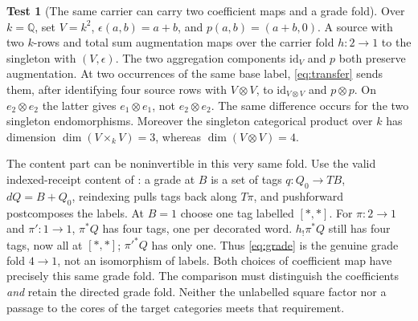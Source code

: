 \documentclass[11pt]{article}
\theoremstyle{definition}
\newtheorem{example}[theorem]{Test}
\newcommand{\id}{\mathrm{id}}
\begin{document}
\begin{example}[The same carrier can carry two coefficient maps and a grade fold]
Over $k=\mathbb Q$, set $V=k^2$, $\epsilon(a,b)=a+b$, and
$p(a,b)=(a+b,0)$. A source with two $k$-rows and total sum augmentation
maps over the carrier fold $h:2\to1$ to the singleton with $(V,\epsilon)$.
The two aggregation components $\id_V$ and $p$ both preserve augmentation.
At two occurrences of the same base label, \eqref{eq:transfer} sends them,
after identifying four source rows with $V\otimes V$, to
$\id_{V\otimes V}$ and $p\otimes p$. On
$e_2\otimes e_2$ the latter gives $e_1\otimes e_1$, not $e_2\otimes e_2$.
The same difference occurs for the two singleton endomorphisms.
Moreover the singleton categorical product over $k$ has dimension
$\dim(V\times_k V)=3$, whereas $\dim(V\otimes V)=4$.

The content part can be noninvertible in this very same fold.
Use the valid indexed-receipt content of \cite[Indexed receipts]{O1}: a grade at $B$
is a set of tags $q:Q_0\to TB$, $dQ=B+Q_0$, reindexing pulls tags
back along $T\pi$, and pushforward postcomposes the labels. At $B=1$
choose one tag labelled $[*,*]$. For $\pi:2\to1$ and
$\pi':1\to1$, $\pi^*Q$ has four tags, one per decorated word.
$h_!\pi^*Q$ still has four tags, now all at $[*,*]$;
$\pi'^*Q$ has only one. Thus \eqref{eq:grade} is the genuine
grade fold $4\to1$, not an isomorphism of labels. Both choices of
coefficient map have precisely this same grade fold. The comparison
must distinguish the coefficients \emph{and} retain the directed grade
fold. Neither the unlabelled square factor nor a passage to the cores
of the target categories meets that requirement.
\end{example}
\end{document}
